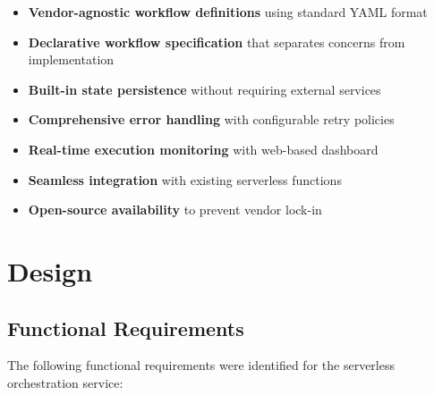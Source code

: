 \documentclass{fisatprojectfinal}
\begin{document}
\begin{itemize}
    \item \textbf{Vendor-agnostic workflow definitions} using standard YAML format
    \item \textbf{Declarative workflow specification} that separates concerns from implementation
    \item \textbf{Built-in state persistence} without requiring external services
    \item \textbf{Comprehensive error handling} with configurable retry policies
    \item \textbf{Real-time execution monitoring} with web-based dashboard
    \item \textbf{Seamless integration} with existing serverless functions
    \item \textbf{Open-source availability} to prevent vendor lock-in
\end{itemize}

\chapter{Design}

\section{Functional Requirements}
The following functional requirements were identified for the serverless orchestration service:
\end{document}
